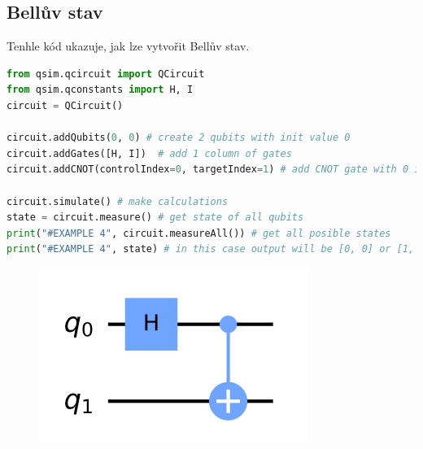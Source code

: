 \documentclass[11pt]{article}
\begin{document}
\subsection{Bellův stav}
Tenhle kód ukazuje, jak lze vytvořit Bellův stav.
\begin{lstlisting}[language=Python, caption=Bell state]
from qsim.qcircuit import QCircuit
from qsim.qconstants import H, I
circuit = QCircuit()

circuit.addQubits(0, 0) # create 2 qubits with init value 0
circuit.addGates([H, I])  # add 1 column of gates
circuit.addCNOT(controlIndex=0, targetIndex=1) # add CNOT gate with 0 index qubit as control and 1 index as target

circuit.simulate() # make calculations
state = circuit.measure() # get state of all qubits
print("#EXAMPLE 4", circuit.measureAll()) # get all posible states
print("#EXAMPLE 4", state) # in this case output will be [0, 0] or [1, 1] with probability of 0.5
\end{lstlisting}
\begin{figure}[H]
    \includegraphics[scale=.5]{bell_state_scheme}
    \centering
\end{figure}
\end{document}
